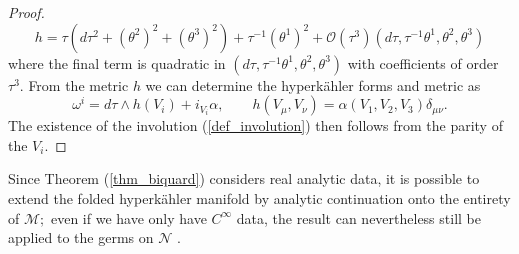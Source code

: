 \documentclass[a4paper,12pt, onecolumn, notitlepage]{article}
\theoremstyle{definition}
\theoremstyle{remark}
\newcommand{\al}{\alpha}
\newcommand{\w}{\omega}
\newcommand{\m}{\mu}
\newcommand{\n}{\nu}
\newcommand{\HK}{hyperk\"ahler }
\begin{document}
\begin{proof}
	\begin{equation*}
		h = \tau(d\tau^{2}+(\theta^{2})^{2} + (\theta^{3})^{2}) + \tau^{-1}(\theta^{1})^{2} + \mathcal{O}(\tau^{3})(d\tau,\tau^{-1}\theta^{1},\theta^{2},\theta^{3})
	\end{equation*}
	where the final term is quadratic in $(d\tau,\tau^{-1}\theta^{1},\theta^{2},\theta^{3})$ with coefficients of order $\tau^{3}.$ From the metric $h$ we can determine the \HK forms and metric as
	\begin{equation*}
		\w^{i}=d\tau\wedge h(V_{i}) + i_{V_{i}}\al,\qquad h(V_{\m},V_{\n})=\al(V_{1},V_{2},V_{3})\delta_{\m\n}.
	\end{equation*}
	The existence of the involution (\ref{def_involution}) then follows from the parity of the $V_{i}.$
\end{proof}
Since Theorem (\ref{thm_biquard}) considers real analytic data, it is possible to extend the folded \HK manifold by analytic continuation onto the entirety of $\mathcal{M};$ even if we have only have $C^{\infty}$ data, the result can nevertheless still be applied to the germs on $\mathcal{N}$ \cite{biquard_2015}.
\end{document}
